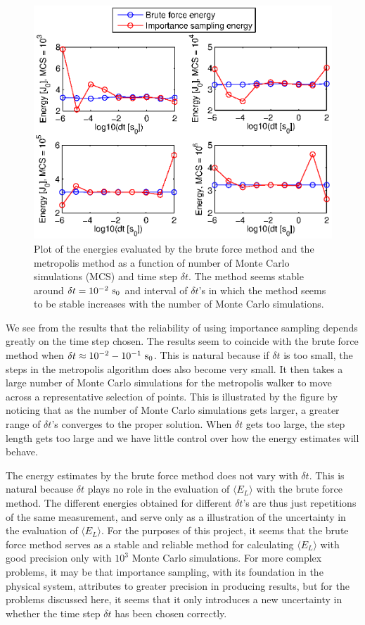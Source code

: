 \begin{figure}[h!]
	\centering 
	\includegraphics[width=\textwidth]{results/importance_sampling.eps}
	\caption{Plot of the energies evaluated by the brute force method and the metropolis method as a function of number of Monte Carlo simulations (MCS) and time step $\delta t$.
	The method seems stable around $\delta t = 10^{-2} ~\textrm{s}_0$ and interval of $\delta t$'s in which the method seems to be stable increases with the number of Monte Carlo simulations.}
	\label{fig:importance_sampling}
\end{figure}

We see from the results that the reliability of using importance sampling depends greatly on the time step chosen. 
The results seem to coincide with the brute force method when $\delta t \approx 10^{-2} - 10^{-1} ~\textrm{s}_0$.
This is natural because if $\delta t$ is too small, the steps in the metropolis algorithm does also become very small. 
It then takes a large number of Monte Carlo simulations for the metropolis walker to move across a representative  selection of points. 
This is illustrated by the figure by noticing that as the number of Monte Carlo simulations gets larger, a greater range of $\delta t$'s converges to the proper solution. 
When $\delta t$ gets too large, the step length gets too large and we have little control over how the energy estimates will behave. 

The energy estimates by the brute force method does not vary with $\delta t$. 
This is natural because $\delta t$ plays no role in the evaluation of $\langle E_L \rangle$ with the brute force method. 
The different energies obtained for different $\delta t$'s are thus just repetitions of the same measurement, and serve only as a illustration of the uncertainty in the evaluation of $\langle E_L \rangle$. 
For the purposes of this project, it seems that the brute force method serves as a stable and reliable method for calculating $\langle E_L \rangle$ with good precision only with $10^3$ Monte Carlo simulations. 
For more complex problems, it may be that importance sampling, with its foundation in the physical system, attributes to greater precision in producing results, but for the problems discussed here, it seems that it only introduces a new uncertainty in whether the time step $\delta t$ has been chosen correctly. 

